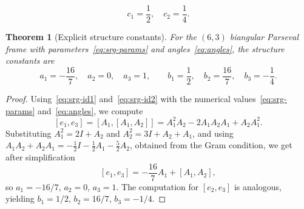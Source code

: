 \documentclass[10pt,a4paper]{amsart}
\newtheorem{theorem}{Theorem}
\begin{document}
	\begin{equation}
		c_1 = \frac{1}{2},\quad c_2 = \frac{1}{4}. \label{eq:angles}
	\end{equation}

	\begin{theorem}[Explicit structure constants]\label{thm:structure}
		For the $(6,3)$ biangular Parseval frame with parameters~\eqref{eq:srg-params} and angles~\eqref{eq:angles}, the structure constants are
		\[
		a_1 = -\frac{16}{7}, \quad a_2 = 0, \quad a_3 = 1, \qquad
		b_1 = \frac{1}{2}, \quad b_2 = \frac{16}{7}, \quad b_3 = -\frac{1}{4}.
		\]
	\end{theorem}

	\begin{proof} Using~\eqref{eq:srg-id1} and~\eqref{eq:srg-id2} with the numerical values~\eqref{eq:srg-params} and~\eqref{eq:angles}, we compute
		\[
		[e_1,e_3] = [A_1, [A_1,A_2]] = A_1^2A_2 - 2A_1A_2A_1 + A_2A_1^2.
		\]
		Substituting $A_1^2 = 2I + A_2$ and $A_2^2 = 3I + A_2 + A_1$, and using $A_1A_2 + A_2A_1 = -\frac{1}{2}I - \frac{1}{2}A_1 - \frac{5}{2}A_2$, obtained from the Gram condition, we get after simplification
		\[
		[e_1,e_3] = -\frac{16}{7}A_1 + [A_1,A_2],
		\]
		so $a_1 = -16/7$, $a_2 = 0$, $a_3 = 1$. The computation for $[e_2,e_3]$ is analogous, yielding $b_1 = 1/2$, $b_2 = 16/7$, $b_3 = -1/4$.
	\end{proof}
\end{document}
